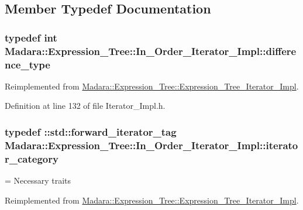 \subsection{Member Typedef Documentation}
\hypertarget{classMadara_1_1Expression__Tree_1_1In__Order__Iterator__Impl_a1bf230e1039e07e863f68425a4e53238}{
\subsubsection[{difference\_\-type}]{\setlength{\rightskip}{0pt plus 5cm}typedef int {\bf Madara::Expression\_\-Tree::In\_\-Order\_\-Iterator\_\-Impl::difference\_\-type}}}
\label{d5/d7e/classMadara_1_1Expression__Tree_1_1In__Order__Iterator__Impl_a1bf230e1039e07e863f68425a4e53238}


Reimplemented from \hyperlink{classMadara_1_1Expression__Tree_1_1Expression__Tree__Iterator__Impl_ae0238cb942a1398b7cd91dffe4c5ba3c}{Madara::Expression\_\-Tree::Expression\_\-Tree\_\-Iterator\_\-Impl}.



Definition at line 132 of file Iterator\_\-Impl.h.

\hypertarget{classMadara_1_1Expression__Tree_1_1In__Order__Iterator__Impl_a5f8929d840ab9350d02d69316eead171}{
\subsubsection[{iterator\_\-category}]{\setlength{\rightskip}{0pt plus 5cm}typedef ::std::forward\_\-iterator\_\-tag {\bf Madara::Expression\_\-Tree::In\_\-Order\_\-Iterator\_\-Impl::iterator\_\-category}}}
\label{d5/d7e/classMadara_1_1Expression__Tree_1_1In__Order__Iterator__Impl_a5f8929d840ab9350d02d69316eead171}


= Necessary traits 



Reimplemented from \hyperlink{classMadara_1_1Expression__Tree_1_1Expression__Tree__Iterator__Impl_a59d9cb2efd705e21684d901de09399c7}{Madara::Expression\_\-Tree::Expression\_\-Tree\_\-Iterator\_\-Impl}.



